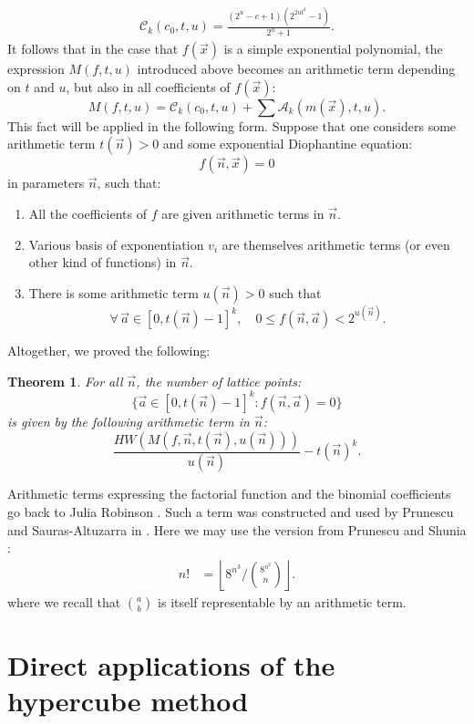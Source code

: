 \documentclass[10pt]{article}
\theoremstyle{plain}
\newtheorem{theorem}{Theorem}[section]
\newcommand{\floor}[1]{\left\lfloor #1 \right\rfloor}
\newcommand{\CTerm}{\mathcal{C}}
\begin{document}
\begin{align} \label{TermC}
\CTerm_k(c_0, t, u)
= \frac{(2^{u} - c + 1)(2^{2u t^k} - 1)}{2^{u} + 1}.
\end{align}
It follows that in the case that $f(\vec x)$ is a simple exponential polynomial, the expression $M(f,t,u)$ introduced above
becomes an arithmetic term depending on $t$ and $u$, but also in all coefficients of $f(\vec x)$:
$$M(f,t,u) = \CTerm_k(c_0, t, u) + \sum \mathcal{A}_k(m(\vec{x}), t, u). $$
This fact will be applied in the following form. Suppose that one considers some arithmetic term $t(\vec n) > 0$ and some exponential Diophantine equation:
$$f(\vec n, \vec x) = 0$$
in parameters $\vec n$, such that:
\begin{enumerate}
    \item[(i)] All the coefficients of $f$ are given arithmetic terms in $\vec n$.
    \item[(ii)] Various basis of exponentiation $v_i$ are themselves
    arithmetic terms (or even other kind of functions) in $\vec n$.
    \item[(iii)] There is some arithmetic term $u(\vec n) > 0$ such that
    $$\forall \,\vec a \in [0, t(\vec n)-1]^k, \quad 0 \leq f(\vec n, \vec a) < 2^{u(\vec n)}.$$
\end{enumerate}

Altogether, we proved the following:
\begin{theorem}\label{proof:numberofsolutions}
For all $\vec n$,  the number of lattice points:
$$\{\vec a \in [0, t(\vec n)-1]^k: f(\vec n, \vec a) = 0 \}$$
is given by the following arithmetic term in $\vec n$:
$$\frac{ HW(M(f, \vec n, t(\vec n),u(\vec n))) }{u(\vec n)} - t(\vec n)^k.$$
\end{theorem}

 Arithmetic terms expressing the factorial function and the binomial coefficients go back to Julia Robinson \cite{robinson}. Such a term was constructed and used by Prunescu and Sauras-Altuzarra in \cite{prunescu2024factorial}. Here we may use the version from Prunescu and Shunia \cite{prunescushunia2024primes}:
\begin{align*}
n! &= \floor{ 8^{n^3} \Big/ \binom{8^{n^2}}{n} } .
\end{align*}
where we recall that $\binom{a}{b}$ is itself representable by an arithmetic term.

\section{Direct applications of the hypercube method}\label{sectiondirectapplications}
\end{document}
